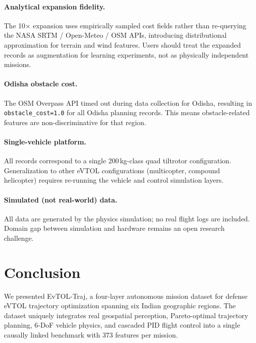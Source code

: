 \documentclass{article}
\begin{document}
\paragraph{Analytical expansion fidelity.}
The 10$\times$ expansion uses empirically sampled cost fields rather than
re-querying the NASA SRTM / Open-Meteo / OSM APIs, introducing distributional
approximation for terrain and wind features. Users should treat the expanded
records as augmentation for learning experiments, not as physically independent
missions.

\paragraph{Odisha obstacle cost.}
The OSM Overpass API timed out during data collection for Odisha, resulting
in \texttt{obstacle\_cost=1.0} for all Odisha planning records. This means
obstacle-related features are non-discriminative for that region.

\paragraph{Single-vehicle platform.}
All records correspond to a single 200\,kg-class quad tiltrotor configuration.
Generalization to other eVTOL configurations (multicopter, compound helicopter)
requires re-running the vehicle and control simulation layers.

\paragraph{Simulated (not real-world) data.}
All data are generated by the physics simulation; no real flight logs are
included. Domain gap between simulation and hardware remains an open research challenge.

\section{Conclusion}
\label{sec:conclusion}

We presented EvTOL-Traj, a four-layer autonomous mission dataset for defense
eVTOL trajectory optimization spanning six Indian geographic regions.
The dataset uniquely integrates real geospatial perception, Pareto-optimal
trajectory planning, 6-DoF vehicle physics, and cascaded PID flight control
into a single causally linked benchmark with 373 features per mission.
\end{document}
